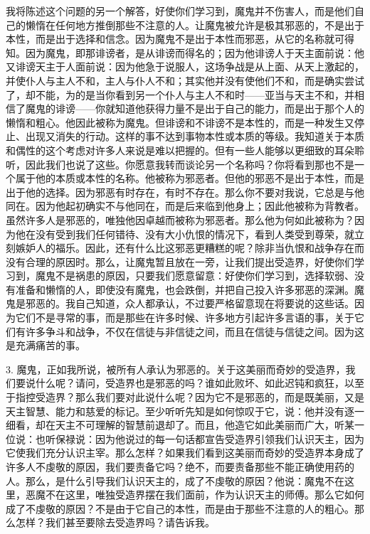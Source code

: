 我将陈述这个问题的另一个解答，好使你们学习到，魔鬼并不伤害人，而是他们自己的懒惰在任何地方推倒那些不注意的人。让魔鬼被允许是极其邪恶的，不是出于本性，而是出于选择和信念。因为魔鬼不是出于本性而邪恶，从它的名称就可得知。因为魔鬼，即那诽谤者，是从诽谤而得名的；因为他诽谤人于天主面前说：他又诽谤天主于人面前说：因为他急于说服人，这场争战是从上面、从天上激起的，并使仆人与主人不和，主人与仆人不和；其实他并没有使他们不和，而是确实尝试了，却不能，为的是当你看到另一个仆人与主人不和时——亚当与天主不和，并相信了魔鬼的诽谤——你就知道他获得力量不是出于自己的能力，而是出于那个人的懒惰和粗心。他因此被称为魔鬼。但诽谤和不诽谤不是本性的，而是一种发生又停止、出现又消失的行动。这样的事不达到事物本性或本质的等级。我知道关于本质和偶性的这个考虑对许多人来说是难以把握的。但有一些人能够以更细致的耳朵聆听，因此我们也说了这些。你愿意我转而谈论另一个名称吗？你将看到那也不是一个属于他的本质或本性的名称。他被称为邪恶者。但他的邪恶不是出于本性，而是出于他的选择。因为邪恶有时存在，有时不存在。那么你不要对我说，它总是与他同在。因为他起初确实不与他同在，而是后来临到他身上；因此他被称为背教者。虽然许多人是邪恶的，唯独他因卓越而被称为邪恶者。那么他为何如此被称为？因为他在没有受到我们任何错待、没有大小仇恨的情况下，看到人类受到尊荣，就立刻嫉妒人的福乐。因此，还有什么比这邪恶更糟糕的呢？除非当仇恨和战争存在而没有合理的原因时。那么，让魔鬼暂且放在一旁，让我们提出受造界，好使你们学习到，魔鬼不是祸患的原因，只要我们愿意留意：好使你们学习到，选择软弱、没有准备和懒惰的人，即使没有魔鬼，也会跌倒，并把自己投入许多邪恶的深渊。魔鬼是邪恶的。我自己知道，众人都承认，不过要严格留意现在将要说的这些话。因为它们不是寻常的事，而是那些在许多时候、许多地方引起许多言语的事，关于它们有许多争斗和战争，不仅在信徒与非信徒之间，而且在信徒与信徒之间。因为这是充满痛苦的事。\par

3. 魔鬼，正如我所说，被所有人承认为邪恶的。关于这美丽而奇妙的受造界，我们要说什么呢？请问，受造界也是邪恶的吗？谁如此败坏、如此迟钝和疯狂，以至于指控受造界？那么我们要对此说什么呢？因为它不是邪恶的，而是既美丽，又是天主智慧、能力和慈爱的标记。至少听听先知是如何惊叹于它，说：他并没有逐一细看，却在天主不可理解的智慧前退却了。而且，他造它如此美丽而广大，听某一位说：也听保禄说：因为他说过的每一句话都宣告受造界引领我们认识天主，因为它使我们充分认识主宰。那么怎样？如果我们看到这美丽而奇妙的受造界本身成了许多人不虔敬的原因，我们要责备它吗？绝不，而要责备那些不能正确使用药的人。那么，是什么引导我们认识天主的，成了不虔敬的原因？他说：魔鬼不在这里，恶魔不在这里，唯独受造界摆在我们面前，作为认识天主的师傅。那么它如何成了不虔敬的原因？不是由于它自己的本性，而是由于那些不注意的人的粗心。那么怎样？我们甚至要除去受造界吗？请告诉我。\par

